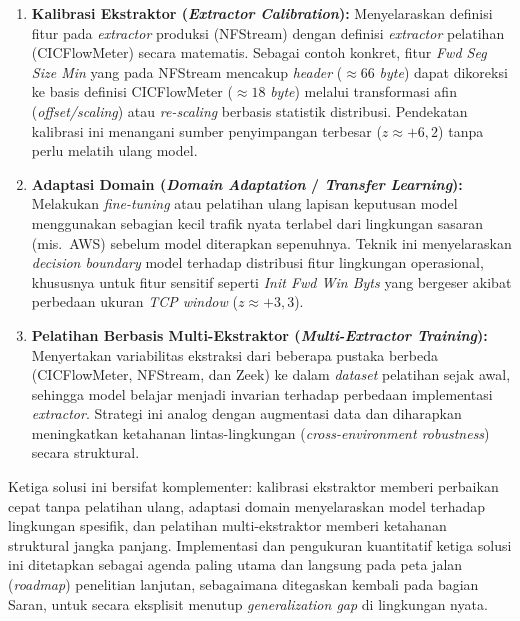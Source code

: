 \documentclass[11pt, a4paper]{article}
\begin{document}
\begin{enumerate}
    \item \textbf{Kalibrasi Ekstraktor (\textit{Extractor Calibration}):} Menyelaraskan definisi fitur pada \textit{extractor} produksi (NFStream) dengan definisi \textit{extractor} pelatihan (CICFlowMeter) secara matematis. Sebagai contoh konkret, fitur \textit{Fwd Seg Size Min} yang pada NFStream mencakup \textit{header} ($\approx 66$ \textit{byte}) dapat dikoreksi ke basis definisi CICFlowMeter ($\approx 18$ \textit{byte}) melalui transformasi afin (\textit{offset/scaling}) atau \textit{re-scaling} berbasis statistik distribusi. Pendekatan kalibrasi ini menangani sumber penyimpangan terbesar ($z \approx +6{,}2$) tanpa perlu melatih ulang model.

    \item \textbf{Adaptasi Domain (\textit{Domain Adaptation} / \textit{Transfer Learning}):} Melakukan \textit{fine-tuning} atau pelatihan ulang lapisan keputusan model menggunakan sebagian kecil trafik nyata terlabel dari lingkungan sasaran (mis.\ AWS) sebelum model diterapkan sepenuhnya. Teknik ini menyelaraskan \textit{decision boundary} model terhadap distribusi fitur lingkungan operasional, khususnya untuk fitur sensitif seperti \textit{Init Fwd Win Byts} yang bergeser akibat perbedaan ukuran \textit{TCP window} ($z \approx +3{,}3$).

    \item \textbf{Pelatihan Berbasis Multi-Ekstraktor (\textit{Multi-Extractor Training}):} Menyertakan variabilitas ekstraksi dari beberapa pustaka berbeda (CICFlowMeter, NFStream, dan Zeek) ke dalam \textit{dataset} pelatihan sejak awal, sehingga model belajar menjadi invarian terhadap perbedaan implementasi \textit{extractor}. Strategi ini analog dengan augmentasi data dan diharapkan meningkatkan ketahanan lintas-lingkungan (\textit{cross-environment robustness}) secara struktural.
\end{enumerate}

Ketiga solusi ini bersifat komplementer: kalibrasi ekstraktor memberi perbaikan cepat tanpa pelatihan ulang, adaptasi domain menyelaraskan model terhadap lingkungan spesifik, dan pelatihan multi-ekstraktor memberi ketahanan struktural jangka panjang. Implementasi dan pengukuran kuantitatif ketiga solusi ini ditetapkan sebagai agenda paling utama dan langsung pada peta jalan (\textit{roadmap}) penelitian lanjutan, sebagaimana ditegaskan kembali pada bagian Saran, untuk secara eksplisit menutup \textit{generalization gap} di lingkungan nyata.
\end{document}
